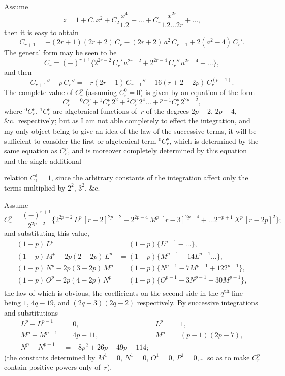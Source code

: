 \documentclass[11pt,a4paper]{book}
\begin{document}
Assume
\[
z = 1 + C_1 x^2 + C_2 \frac{x^4}{1.2} + \ldots + C_r \frac{x^{2r}}{1.2\ldots 2r} + \ldots,
\]
then it is easy to obtain
\[
C_{r+1} = -(2r+1)(2r+2)\,C_r - (2r+2)\,a^2\,C_{r+1} + 2(a^2-4)\,C_r'.
\]
The general form may be seen to be
\[
C_r = (-)^{r+1}\{2^{2r-2}\,C_r'\,a^{2r-2} + 2^{2r-4}\,C_r''\,a^{2r-4} + \ldots\},
\]
and then
\[
C_{r+1}'' - p\,C_r'' = -r(2r-1)\,C_{r-1}'' + 16(r+2-2p)\,C_r^{(p-1)}.
\]
The complete value of $C_r^p$ (assuming $C_r^0 = 0$) is given by an equation of the form
\[
C_r^p = {}^0C_r^p + {}^1C_r^p\,2^2 + {}^2C_r^p\,2^4 \ldots + {}^{p-1}C_r^p\,2^{2p-2},
\]
where ${}^0C_r^p$, ${}^1C_r^p$ are algebraical functions of~$r$ of the degrees $2p-2$, $2p-4$, \&c.\ respectively; but as I am not able completely to effect the integration, and my only object being to give an idea of the law of the successive terms, it will be sufficient to consider the first or algebraical term ${}^0C_r^p$, which is determined by the same equation as $C_r^p$, and is moreover completely determined by this equation and the single additional

\newpage
relation $C_1^1 = 1$, since the arbitrary constants of the integration affect only the terms multiplied by $2^2$, $3^2$, \&c.

Assume
\[
C_r^p = \frac{(-)^{r+1}}{2^{2p-2}}\{2^{2p-2}\,L^p\,[r-2]^{2p-2} + 2^{2p-4}\,M^p\,[r-3]^{2p-4} + \ldots 2^{-p+1}\,X^p\,[r-2p]^2\};
\]
and substituting this value,
\begin{align*}
(1-p)\,L^p &= (1-p)\{L^{p-1} - \ldots\},\\
(1-p)\,M^p - 2p(2-2p)\,L^p &= (1-p)\{M^{p-1} - 14L^{p-1}\ldots\},\\
(1-p)\,N^p - 2p(3-2p)\,M^p &= (1-p)\{N^{p-1} - 7M^{p-1} + 122^{p-1}\},\\
(1-p)\,O^p - 2p(4-2p)\,N^p &= (1-p)\{O^{p-1} - 3N^{p-1} + 30M^{p-1}\},
\end{align*}
the law of which is obvious, the coefficients on the second side in the $q$\textsuperscript{th} line being $1$, $4q-19$, and $(2q-3)(2q-2)$ respectively. By successive integrations and substitutions
\begin{align*}
L^p - L^{p-1} &= 0, & L^p &= 1,\\
M^p - M^{p-1} &= 4p-11, & M^p &= (p-1)(2p-7),\\
N^p - N^{p-1} &= -8p^2 + 26p + 49p - 114;
\end{align*}
(the constants determined by $M^1 = 0$, $N^1 = 0$, $O^1 = 0$, $P^1 = 0$,\ldots\ so as to make $C_r^p$ contain positive powers only of~$r$).
\end{document}
